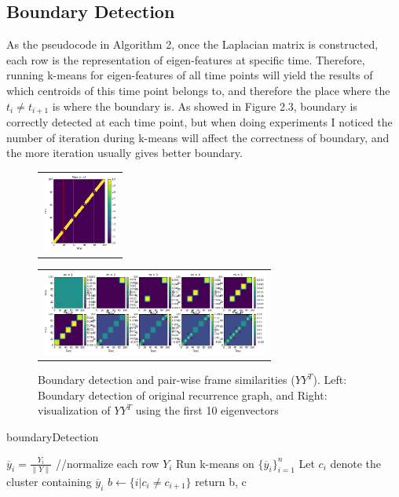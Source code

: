 \documentclass[final]{siamltexmm}
\begin{document}
\subsection{Boundary Detection}
As the pseudocode in Algorithm 2, once the Laplacian matrix is constructed, each row is the representation of eigen-features at specific time. Therefore, running k-means for eigen-features of all time points will yield the results of which centroids of this time point belongs to, and therefore the place where the $t_{i} \neq t_{i+1}$ is where the boundary is. As showed in Figure 2.3, boundary is correctly detected at each time point, but when doing experiments I noticed the number of iteration during k-means will affect the correctness of boundary, and the more iteration usually gives better boundary.
\begin{figure}[H]
\centering
\begin{subfigure}
  \begin{tabular}{c}
  \includegraphics[width=25mm]{./figure/o3_boundary.png}
  \end{tabular}{}
\end{subfigure}
  \begin{tabular}{c}
  \includegraphics[width=75mm]{./figure/o3_eachM.png}
  \end{tabular}{}
\begin{subfigure}
\end{subfigure}
\caption{Boundary detection and pair-wise frame similarities ($YY^T$). Left: Boundary detection of original recurrence graph, and Right: visualization of $YY^T$ using the first 10 eigenvectors}
\end{figure}

\begin{algorithm}[htb]
  \caption{boundaryDetection}

  \label{algo:SC}
\begin{algorithmic}[1]
  \STATE $ \overline y_i = \frac{Y_i}{\parallel Y \parallel}$ //normalize each row $Y_i$
  \STATE Run k-means on $\{ \overline y_i \}_{i=1}^{n}$
  \STATE Let $c_i$ denote the cluster containing $ \overline y_i$
  \STATE $b \leftarrow \{ i|c_i \neq c_{i+1}\}$
  \STATE return b, c
\end{algorithmic}
\end{algorithm}
\end{document}
